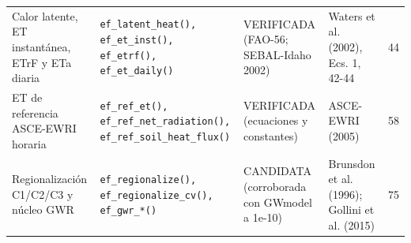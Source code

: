 \begin{tabularx}{\textwidth}{>{\raggedright\arraybackslash}p{3.4cm}>{\raggedright\arraybackslash}X>{\raggedright\arraybackslash}p{2.9cm}>{\raggedright\arraybackslash}p{3.1cm}r}
Calor latente, ET instantánea, ETrF y ETa diaria & \texttt{ef\_latent\_heat(), ef\_et\_inst(), ef\_etrf(), ef\_et\_daily()} & VERIFICADA (FAO-56; SEBAL-Idaho 2002) & Waters et al. (2002), Ecs. 1, 42-44 & 44 \\
ET de referencia ASCE-EWRI horaria & \texttt{ef\_ref\_et(), ef\_ref\_net\_radiation(), ef\_ref\_soil\_heat\_flux()} & VERIFICADA (ecuaciones y constantes) & ASCE-EWRI (2005) & 58 \\
Regionalización C1/C2/C3 y núcleo GWR & \texttt{ef\_regionalize(), ef\_regionalize\_cv(), ef\_gwr\_*()} & CANDIDATA (corroborada con GWmodel a 1e-10) & Brunsdon et al. (1996); Gollini et al. (2015) & 75 \\
\bottomrule
\end{tabularx}
